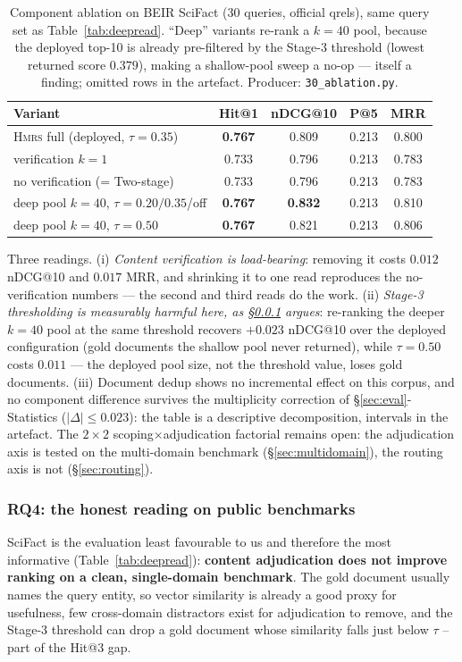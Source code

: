 \documentclass[sigconf, review, anonymous]{acmart}
\newcommand{\sys}{\textsc{Hmrs}}
\begin{document}
\begin{table}[t]
\centering\small
\caption{Component ablation on BEIR SciFact (30 queries, official qrels), same
query set as Table~\ref{tab:deepread}. ``Deep'' variants re-rank a $k{=}40$ pool,
because the deployed top-10 is already pre-filtered by the Stage-3 threshold
(lowest returned score $0.379$), making a shallow-pool sweep a no-op --- itself
a finding; omitted rows in the artefact. Producer: \texttt{30\_ablation.py}.}
\label{tab:ablation}
\begin{tabular}{@{}lcccc@{}}
\toprule
Variant & Hit@1 & nDCG@10 & P@5 & MRR \\
\midrule
\sys{} full (deployed, $\tau{=}0.35$)  & \textbf{0.767} & 0.809 & 0.213 & 0.800 \\
\; verification $k{=}1$               & 0.733 & 0.796 & 0.213 & 0.783 \\
\; no verification (= Two-stage)      & 0.733 & 0.796 & 0.213 & 0.783 \\
\midrule
deep pool $k{=}40$, $\tau{=}0.20/0.35$/off & \textbf{0.767} & \textbf{0.832} & 0.213 & 0.810 \\
deep pool $k{=}40$, $\tau{=}0.50$     & \textbf{0.767} & 0.821 & 0.213 & 0.806 \\
\bottomrule
\end{tabular}
\end{table}

Three readings. (i) \emph{Content verification is load-bearing}: removing it
costs $0.012$ nDCG@10 and $0.017$ MRR, and shrinking it to one read reproduces
the no-verification numbers --- the second and third reads do the work.
(ii) \emph{Stage-3 thresholding is measurably harmful here, as
\S\ref{sec:honest} argues}: re-ranking the deeper $k{=}40$ pool at the same
threshold recovers $+0.023$ nDCG@10 over the deployed configuration (gold
documents the shallow pool never returned), while $\tau{=}0.50$ costs $0.011$
--- the deployed pool size, not the threshold value, loses gold documents.
(iii) Document dedup shows no incremental effect on this corpus, and no
component difference survives the multiplicity correction of
\S\ref{sec:eval}-Statistics ($|\Delta|\le0.023$): the table is a descriptive
decomposition, intervals in the artefact. The $2\times2$
scoping$\times$adjudication factorial remains open: the adjudication axis is
tested on the multi-domain benchmark (\S\ref{sec:multidomain}), the routing
axis is not (\S\ref{sec:routing}).
\subsubsection{RQ4: the honest reading on public benchmarks}\label{sec:honest}
SciFact is the evaluation least favourable to us and therefore the most
informative (Table~\ref{tab:deepread}): \textbf{content adjudication does not
improve ranking on a clean, single-domain benchmark}. The gold document
usually names the query entity, so vector similarity is already a good proxy
for usefulness, few cross-domain distractors exist for adjudication to remove,
and the Stage-3 threshold can drop a gold document whose similarity falls just
below $\tau$ -- part of the Hit@3 gap.
\end{document}
